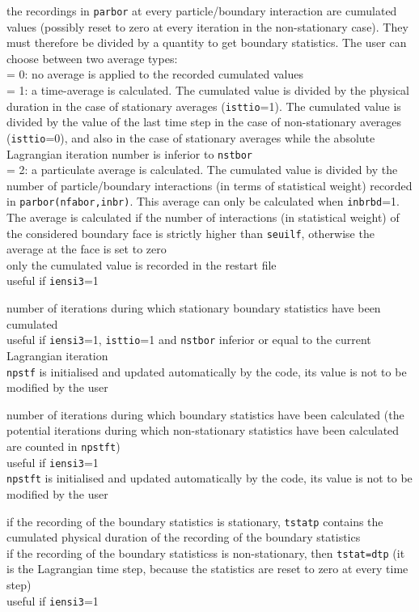 {the recordings in \texttt{parbor} at every particle/boundary interaction are
cumulated values (possibly reset to zero at every iteration in the
non-stationary case). They must therefore be divided by a quantity to
get boundary statistics. The user can choose between two average types:\\
\hspace*{1.3cm} = 0: no average is applied to the recorded cumulated values\\
\hspace*{1.3cm} = 1: a time-average is calculated. The cumulated value
is divided by the physical duration in the case of stationary
averages (\texttt{isttio}=1). The cumulated value is divided by the value of
the last time step in the case of non-stationary averages (\texttt{isttio}=0),
and also in the case of stationary averages while the
absolute Lagrangian iteration number is inferior to \texttt{nstbor}\\
\hspace*{1.3cm} = 2: a particulate average is calculated. The cumulated
value is divided by the number of particle/boundary interactions (in terms of
statistical weight) recorded in \texttt{parbor(nfabor,inbr)}. This average
can only be calculated when \texttt{inbrbd}=1. The average is calculated if
the number of interactions (in statistical weight) of the considered
boundary face is strictly higher than \texttt{seuilf}, otherwise the average
at the face is set to zero\\
only the cumulated value is recorded in the restart file\\
useful if \texttt{iensi3}=1}

{number of iterations during which stationary boundary statistics have
been cumulated\\
useful if \texttt{iensi3}=1, \texttt{isttio}=1 and \texttt{nstbor} inferior
or equal to the current Lagrangian iteration\\
\texttt{npstf} is initialised and updated automatically by the code,
its value is not to be modified by the user}

{number of iterations during which boundary statistics have
been calculated
(the potential iterations during which non-stationary
statistics have been calculated are counted in \texttt{npstft})\\
useful if \texttt{iensi3}=1\\
\texttt{npstft} is initialised and updated automatically by the code,
its value is not to be modified by the user}

{if the recording of the boundary statistics is stationary, \texttt{tstatp}
contains the cumulated physical duration of the recording of the boundary
statistics\\
if the recording of the boundary statisticss is non-stationary, then
\texttt{tstat=dtp} (it is the Lagrangian time step, because the
statistics are reset to zero at every time step)\\
useful if \texttt{iensi3}=1}

